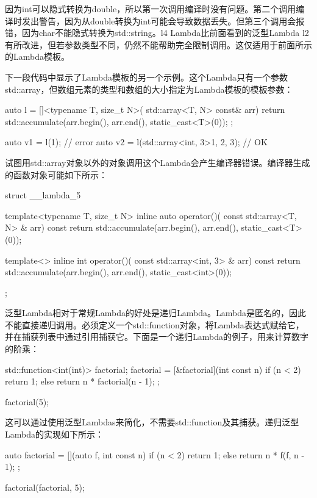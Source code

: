 因为int可以隐式转换为double，所以第一次调用编译时没有问题。第二个调用编译时发出警告，因为从double转换为int可能会导致数据丢失。但第三个调用会报错，因为char不能隐式转换为std::string。l4 Lambda比前面看到的泛型Lambda l2有所改进，但若参数类型不同，仍然不能帮助完全限制调用。这仅适用于前面所示的Lambda模板。

下一段代码中显示了Lambda模板的另一个示例。这个Lambda只有一个参数std::array，但数组元素的类型和数组的大小指定为Lambda模板的模板参数：

\begin{cpp}
auto l = []<typename T, size_t N>(
            std::array<T, N> const& arr)
{
	return std::accumulate(arr.begin(), arr.end(),
	                       static_cast<T>(0));
};

auto v1 = l(1); // error
auto v2 = l(std::array<int, 3>{1, 2, 3}); // OK
\end{cpp}

试图用std::array对象以外的对象调用这个Lambda会产生编译器错误。编译器生成的函数对象可能如下所示：

\begin{cpp}
struct __lambda_5
{
	template<typename T, size_t N>
	inline auto operator()(
		const std::array<T, N> & arr) const
	{
		return std::accumulate(arr.begin(), arr.end(),
							   static_cast<T>(0));
	}

	template<>
	inline int operator()(
		const std::array<int, 3> & arr) const
	{
		return std::accumulate(arr.begin(), arr.end(),
							   static_cast<int>(0));
	}
};
\end{cpp}

泛型Lambda相对于常规Lambda的好处是递归Lambda。Lambda是匿名的，因此不能直接递归调用。必须定义一个std::function对象，将Lambda表达式赋给它，并在捕获列表中通过引用捕获它。下面是一个递归Lambda的例子，用来计算数字的阶乘：

\begin{cpp}
std::function<int(int)> factorial;
factorial = [&factorial](int const n) {
	if (n < 2) return 1;
	else return n * factorial(n - 1);
};

factorial(5);
\end{cpp}

这可以通过使用泛型Lambdas来简化，不需要std::function及其捕获。递归泛型Lambda的实现如下所示：

\begin{cpp}
auto factorial = [](auto f, int const n) {
	if (n < 2) return 1;
	else return n * f(f, n - 1);
};

factorial(factorial, 5);
\end{cpp}

